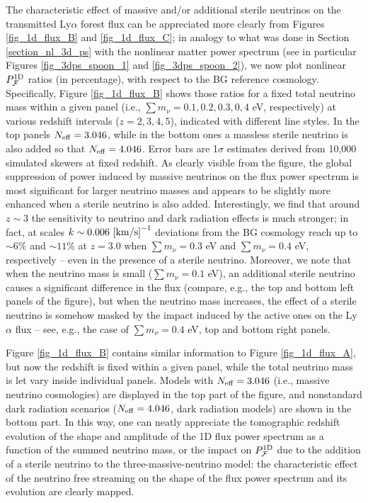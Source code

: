 \documentclass{emulateapj}
\begin{document}

The characteristic effect of massive and/or additional sterile neutrinos on the transmitted Ly$\alpha$ forest flux can be 
appreciated more clearly from Figures \ref{fig_1d_flux_B} and \ref{fig_1d_flux_C};
in analogy to what was done in Section \ref{section_nl_3d_ps} 
with the nonlinear matter power spectrum (see in particular Figures \ref{fig_3dps_spoon_1} and \ref{fig_3dps_spoon_2}),
we now plot nonlinear $P^{\rm 1D}_{{\cal{F}}}$ ratios (in percentage), with respect to the BG reference cosmology.
Specifically, Figure \ref{fig_1d_flux_B} shows those ratios for a fixed total neutrino mass within a given panel (i.e., $\sum m_{\nu}=0.1, 0.2, 0.3, 0,4$ eV, respectively) 
at various redshift intervals ($z=2,3,4,5$), indicated with different line styles.  
In the top panels $N_{\rm eff}=3.046$, while in the bottom ones a massless sterile neutrino is also added so that $N_{\rm eff}=4.046$.
Error bars are 1$\sigma$ estimates derived from 10,000 simulated skewers at fixed redshift.
As clearly visible from the figure, the global suppression of power induced by massive neutrinos  
on the flux power spectrum is most significant for larger neutrino masses and appears to be slightly  more
enhanced when a sterile neutrino is also added. 
Interestingly, we find that around $z \sim 3$ the sensitivity to neutrino and dark radiation effects is
much stronger; in fact, at scales $k \sim 0.006~{\rm [km/s]}^{-1}$ deviations from the BG cosmology reach up to $\sim 6\%$ and $\sim 11\%$ at $z=3.0$
when $\sum m_{\nu}=0.3$ eV and $\sum m_{\nu}=0.4$ eV, respectively -- even in the presence of a sterile neutrino. 
Moreover, we  note that when the neutrino mass is small ($\sum m_{\nu} =0.1$ eV), an additional sterile neutrino causes 
a significant difference in the flux (compare, e.g., the top and bottom left panels of the figure), but when the neutrino mass increases, the effect of a  sterile neutrino is
somehow masked by the impact induced by the active ones  on the Ly$\alpha$ flux  -- see, e.g., the case of $\sum m_{\nu} =0.4$ eV, top and bottom right panels.

Figure \ref{fig_1d_flux_B} contains similar information to Figure \ref{fig_1d_flux_A}, but now the redshift is fixed within a given panel, while the 
total neutrino mass is let vary inside individual panels. Models with $N_{\rm eff}=3.046$ (i.e., massive neutrino cosmologies) are displayed in the top part of the figure, 
and nonstandard dark radiation scenarios  ($N_{\rm eff}=4.046$, dark radiation models) are shown in the bottom part.
In this way, one can neatly appreciate the tomographic redshift evolution of the shape and amplitude of the 1D flux power spectrum as a function of the summed neutrino mass, or
the impact on $ P^{\rm 1D}_{{\cal{F}}}$ due to the addition of a sterile neutrino 
to the three-massive-neutrino model: the characteristic effect of the neutrino free streaming on the shape of the flux power spectrum and its
evolution are clearly mapped. 
 
\end{document}
